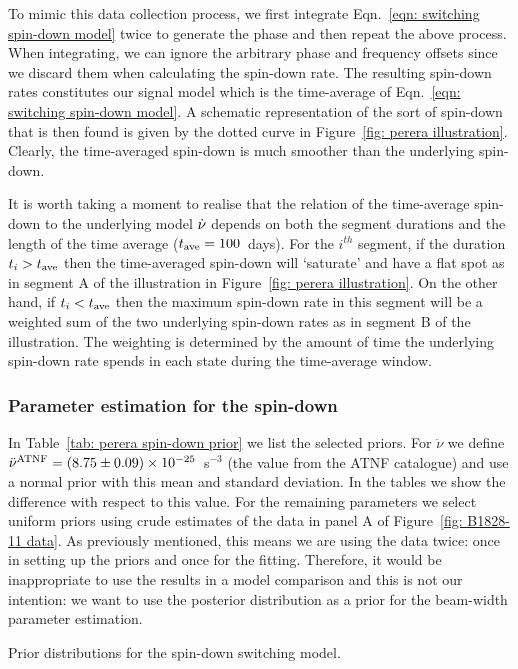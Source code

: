 \documentclass[../full_thesis/full_thesis.tex]{subfiles}
\newcommand{\thisdir}{../comparing_periodic_modulations}
\begin{document}
To mimic this data collection process, we first integrate Eqn.~\eqref{eqn:
switching spin-down model} twice to generate the phase and then repeat the
above process.  When integrating, we can ignore the arbitrary phase and
frequency offsets since we discard them when calculating the spin-down rate.
The resulting spin-down rates constitutes our signal model which is the
time-average of Eqn.~\eqref{eqn: switching spin-down model}.  A schematic
representation of the sort of spin-down that is then found is given by the
dotted curve in Figure~\ref{fig: perera illustration}.  Clearly, the
time-averaged spin-down is much smoother than the underlying spin-down.


It is worth taking a moment to realise that the relation of the time-average
spin-down to the underlying model $\dot{\nu}$ depends on both the segment
durations and the length of the time average ($t_{\mathrm{ave}}=100$~days). For the
$i^{th}$ segment, if the duration $t_{i} > t_{\mathrm{ave}}$ then the time-averaged
spin-down will `saturate' and have a flat spot as in segment A of the
illustration in Figure~\ref{fig: perera illustration}. On the other hand, if
$t_{i} < t_{\mathrm{ave}}$ then the maximum spin-down rate in this segment will be a
weighted sum of the two underlying spin-down rates as in segment B of the
illustration. The weighting is determined by the amount of time the underlying
spin-down rate spends in each state during the time-average window.


\subsubsection{Parameter estimation for the spin-down}

In Table~\ref{tab: perera spin-down prior} we list the selected priors. For
$\ddot{\nu}$ we define
$\ddot{\nu}^{\tiny\mathrm{ATNF}}=(8.75\pm0.09)\times10^{-25}$~s$^{-3}$ (the
value from the ATNF catalogue) and use a normal prior with this mean and
standard deviation. In the tables we show the difference with respect to this
value. For the remaining parameters we select uniform priors using
crude estimates of the data in panel A of Figure~\ref{fig: B1828-11 data}.
As previously mentioned, this means we are using the
data twice: once in setting up the priors and once for the fitting. Therefore,
it would be inappropriate to use the results in a model comparison and this is
not our intention: we want to use the posterior distribution as a prior for the
beam-width parameter estimation.
\begin{table}[htb]
\small
\centering
\caption{Prior distributions for the spin-down switching model.}
\label{tab: perera spin-down prior}

\end{table}
\end{document}
